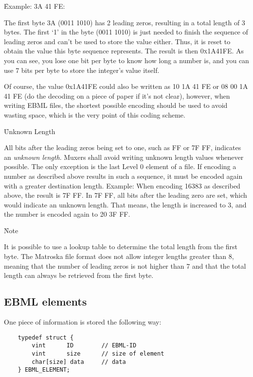 \documentclass[12pt]{article}
\begin{document}
\f{Example:}
3A 41 FE: 

The first byte 3A ({\color{red}00}11 1010) has 2 leading zeros, resulting in a total length of 3 bytes. The first `1' in the byte (00{\color{red}1}1 1010) is just needed to finish the sequence of leading zeros and can't be used to store the value either. Thus, it is reset to obtain the value this byte sequence represents. The result is then \textsc{0x1A41FE}. As you can see, you lose one bit per byte to know how long a number is, and you can use 7 bits per byte to store the integer's value itself.

Of course, the value 0x1A41FE could also be written as 10 1A 41 FE  or  08 00 1A 41 FE (do the decoding on a piece of paper if it's not clear), however, when writing EBML files, the shortest possible encoding should be used to avoid wasting space, which is the very point of this coding scheme.

\f{Unknown Length}

All bits after the leading zeros being set to one, such as FF or 7F FF, indicates an \textsl{unknown length}. Muxers shall avoid writing unknown length values whenever possible. The only exception is the last Level 0 element of a file. If encoding a number as described above results in such a sequence, it must be encoded again with a greater destination length. Example: When encoding 16383 as described above, the result is 7F FF. In 7F FF, all bits after the leading zero are set, which would indicate an unknown length. That means, the length is increased to 3, and the number is encoded again to 20 3F FF.

\f{Note}

It is possible to use a lookup table to determine the total length from the first byte. The Matroska file format does not allow integer lengths greater than 8, meaning that the number of leading zeros is not higher than 7 and that the total length can always be retrieved from the first byte.

\subsection{EBML elements}
One piece of information is stored the following way:

\begin{verbatim}    typedef struct {
        vint      ID        // EBML-ID
        vint      size      // size of element
        char[size] data     // data
    } EBML_ELEMENT;\end{verbatim}
\end{document}
